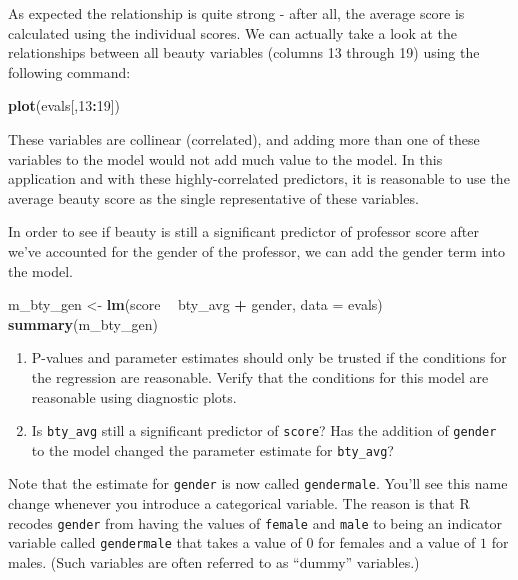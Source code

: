 \documentclass[
]{article}
\newenvironment{Shaded}{\begin{snugshade}}{\end{snugshade}}
\newcommand{\DataTypeTok}[1]{\textcolor[rgb]{0.13,0.29,0.53}{#1}}
\newcommand{\DecValTok}[1]{\textcolor[rgb]{0.00,0.00,0.81}{#1}}
\newcommand{\KeywordTok}[1]{\textcolor[rgb]{0.13,0.29,0.53}{\textbf{#1}}}
\newcommand{\NormalTok}[1]{#1}
\newcommand{\OperatorTok}[1]{\textcolor[rgb]{0.81,0.36,0.00}{\textbf{#1}}}
\newcommand{\StringTok}[1]{\textcolor[rgb]{0.31,0.60,0.02}{#1}}
\begin{document}
As expected the relationship is quite strong - after all, the average
score is calculated using the individual scores. We can actually take a
look at the relationships between all beauty variables (columns 13
through 19) using the following command:

\begin{Shaded}
\begin{Highlighting}[]
\KeywordTok{plot}\NormalTok{(evals[,}\DecValTok{13}\OperatorTok{:}\DecValTok{19}\NormalTok{])}
\end{Highlighting}
\end{Shaded}

These variables are collinear (correlated), and adding more than one of
these variables to the model would not add much value to the model. In
this application and with these highly-correlated predictors, it is
reasonable to use the average beauty score as the single representative
of these variables.

In order to see if beauty is still a significant predictor of professor
score after we've accounted for the gender of the professor, we can add
the gender term into the model.

\begin{Shaded}
\begin{Highlighting}[]
\NormalTok{m_bty_gen <-}\StringTok{ }\KeywordTok{lm}\NormalTok{(score }\OperatorTok{~}\StringTok{ }\NormalTok{bty_avg }\OperatorTok{+}\StringTok{ }\NormalTok{gender, }\DataTypeTok{data =}\NormalTok{ evals)}
\KeywordTok{summary}\NormalTok{(m_bty_gen)}
\end{Highlighting}
\end{Shaded}

\begin{enumerate}
\def\labelenumi{\arabic{enumi}.}
\setcounter{enumi}{6}
\item
  P-values and parameter estimates should only be trusted if the
  conditions for the regression are reasonable. Verify that the
  conditions for this model are reasonable using diagnostic plots.
\item
  Is \texttt{bty\_avg} still a significant predictor of \texttt{score}?
  Has the addition of \texttt{gender} to the model changed the parameter
  estimate for \texttt{bty\_avg}?
\end{enumerate}

Note that the estimate for \texttt{gender} is now called
\texttt{gendermale}. You'll see this name change whenever you introduce
a categorical variable. The reason is that R recodes \texttt{gender}
from having the values of \texttt{female} and \texttt{male} to being an
indicator variable called \texttt{gendermale} that takes a value of
\(0\) for females and a value of \(1\) for males. (Such variables are
often referred to as ``dummy'' variables.)
\end{document}
